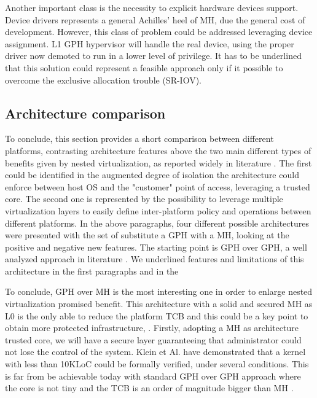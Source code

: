 \documentclass{acm_proc_article-sp} %
\begin{document}
Another important class is the necessity to explicit hardware devices support. Device drivers represents a general Achilles' heel of MH, due the general cost of development. However, this class of problem could be addressed leveraging device assignment. L1 GPH hypervisor will handle the real device, using the proper driver now demoted to run in a lower level of privilege. It has to be underlined that this solution could represent a feasible approach only if it possible to overcome the exclusive allocation trouble (SR-IOV).

\subsection{Architecture comparison}

To conclude, this section provides a short comparison between different platforms, contrasting architecture features above the two main different types of benefits given by nested virtualization, as reported widely in literature \cite{art:blan, nested:berghmans,  cloudvisor:zhang, turtle:ibm}. The first could be identified in the augmented degree of isolation the architecture could enforce between host OS and the "customer" point of access, leveraging a trusted core. The second one is represented by the possibility to leverage multiple virtualization layers to easily define inter-platform policy and operations between different platforms.
In the above paragraphs, four different possible architectures were presented with the set of  substitute a GPH  with a MH, looking at the positive and negative new features. The starting point is GPH over GPH, a well analyzed approach in literature \cite{turtle:ibm, art:blan, }. We underlined features and limitations of this architecture in the first paragraphs and in the 
 
To conclude, GPH over MH is the most interesting one in order to enlarge nested virtualization promised benefit. This architecture with a solid and secured MH as L0 is the only able to reduce the platform TCB and this could be a key point to obtain more protected infrastructure, .
Firstly, adopting a MH as architecture trusted core, we will have a secure layer guaranteeing that administrator could not lose the control of the system. Klein et Al. \cite{Klein:2009} have demonstrated that a kernel with less than 10KLoC could be formally verified, under several conditions. This is far from be achievable today with standard GPH over GPH approach where the core is not tiny and the TCB is an order of 
magnitude bigger than MH \cite{nova}. 
\end{document}
